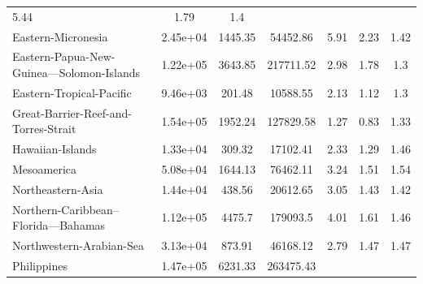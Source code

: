 \begin{table}[H]
{\begin{tabular}{lcccccc}
            5.44                                       & 1.79     & 1.4
            \\
            Eastern-Micronesia                         & 2.45e+04 & 1445.35 &
            54452.86                                   &
            5.91                                       & 2.23     & 1.42
            \\
            Eastern-Papua-New-Guinea---Solomon-Islands & 1.22e+05 & 3643.85 &
            217711.52                                  &
            2.98                                       & 1.78     & 1.3
            \\
            Eastern-Tropical-Pacific                   & 9.46e+03 & 201.48  &
            10588.55                                   &
            2.13                                       & 1.12     & 1.3
            \\
            Great-Barrier-Reef-and-Torres-Strait       & 1.54e+05 & 1952.24 &
            127829.58                                  &
            1.27                                       & 0.83     & 1.33
            \\
            Hawaiian-Islands                           & 1.33e+04 & 309.32  &
            17102.41                                   &
            2.33                                       & 1.29     & 1.46
            \\
            Mesoamerica                                & 5.08e+04 & 1644.13 &
            76462.11                                   &
            3.24                                       & 1.51     & 1.54
            \\
            Northeastern-Asia                          & 1.44e+04 & 438.56  &
            20612.65                                   &
            3.05                                       & 1.43     & 1.42
            \\
            Northern-Caribbean--Florida---Bahamas      & 1.12e+05 & 4475.7  &
            179093.5                                   &
            4.01                                       & 1.61     & 1.46
            \\
            Northwestern-Arabian-Sea                   & 3.13e+04 & 873.91  &
            46168.12                                   &
            2.79                                       & 1.47     & 1.47
            \\
            Philippines                                & 1.47e+05 & 6231.33 &
            263475.43                                  &

\end{tabular}}
\end{table}
